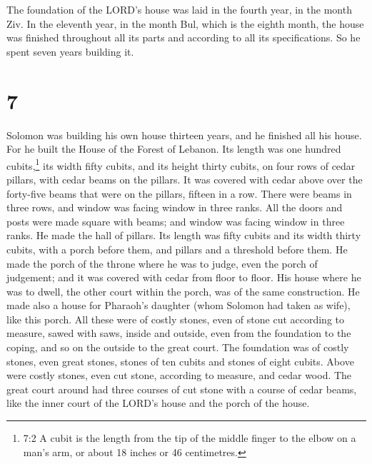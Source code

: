  The foundation of the LORD's house was laid in the fourth
year, in the month Ziv.  In the eleventh year, in the month
Bul, which is the eighth month, the house was finished throughout all
its parts and according to all its specifications. So he spent seven
years building it.

\hypertarget{section-6}{%
\section{7}\label{section-6}}

 Solomon was building his own house thirteen years, and he
finished all his house.  For he built the House of the
Forest of Lebanon. Its length was one hundred cubits,\footnote{7:2 A
  cubit is the length from the tip of the middle finger to the elbow on
  a man's arm, or about 18 inches or 46 centimetres.} its width fifty
cubits, and its height thirty cubits, on four rows of cedar pillars,
with cedar beams on the pillars.  It was covered with cedar
above over the forty-five beams that were on the pillars, fifteen in a
row.  There were beams in three rows, and window was facing
window in three ranks.  All the doors and posts were made
square with beams; and window was facing window in three ranks.
 He made the hall of pillars. Its length was fifty cubits
and its width thirty cubits, with a porch before them, and pillars and a
threshold before them.  He made the porch of the throne
where he was to judge, even the porch of judgement; and it was covered
with cedar from floor to floor.  His house where he was to
dwell, the other court within the porch, was of the same construction.
He made also a house for Pharaoh's daughter (whom Solomon had taken as
wife), like this porch.  All these were of costly stones,
even of stone cut according to measure, sawed with saws, inside and
outside, even from the foundation to the coping, and so on the outside
to the great court.  The foundation was of costly stones,
even great stones, stones of ten cubits and stones of eight cubits.
 Above were costly stones, even cut stone, according to
measure, and cedar wood.  The great court around had three
courses of cut stone with a course of cedar beams, like the inner court
of the LORD's house and the porch of the house.

